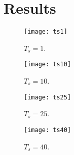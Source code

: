 \chapter{Results}


\begin{figure}
\centering
\texttt{[image: ts1]}
\caption{$T_s = 1$.}
\label{fig:ts1}
\end{figure}

\begin{figure}
\centering
\texttt{[image: ts10]}
\caption{$T_s = 10$.}
\label{fig:ts10}
\end{figure}

\begin{figure}
\centering
\texttt{[image: ts25]}
\caption{$T_s = 25$.}
\label{fig:ts25}
\end{figure}

\begin{figure}
\centering
\texttt{[image: ts40]}
\caption{$T_s = 40$.}
\label{fig:ts40}
\end{figure}